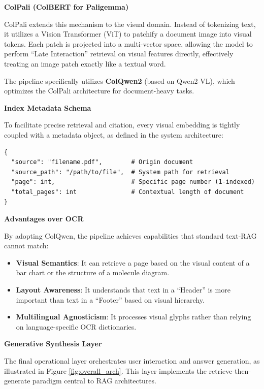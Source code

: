 \textbf{ColPali (ColBERT for Paligemma)}

ColPali extends this mechanism to the visual domain. Instead of tokenizing text, it utilizes a Vision Transformer (ViT) to patchify a document image into visual tokens. Each patch is projected into a multi-vector space, allowing the model to perform ``Late Interaction'' retrieval on visual features directly, effectively treating an image patch exactly like a textual word.

The pipeline specifically utilizes \textbf{ColQwen2} (based on Qwen2-VL), which optimizes the ColPali architecture for document-heavy tasks.

\textbf{Index Metadata Schema}

To facilitate precise retrieval and citation, every visual embedding is tightly coupled with a metadata object, as defined in the system architecture:
\begin{verbatim}
{
  "source": "filename.pdf",        # Origin document
  "source_path": "/path/to/file",  # System path for retrieval
  "page": int,                     # Specific page number (1-indexed)
  "total_pages": int               # Contextual length of document
}
\end{verbatim}

\textbf{Advantages over OCR}

By adopting ColQwen, the pipeline achieves capabilities that standard text-RAG cannot match:
\begin{itemize}
    \item \textbf{Visual Semantics}: It can retrieve a page based on the visual content of a bar chart or the structure of a molecule diagram.
    \item \textbf{Layout Awareness}: It understands that text in a ``Header'' is more important than text in a ``Footer'' based on visual hierarchy.
    \item \textbf{Multilingual Agnosticism}: It processes visual glyphs rather than relying on language-specific OCR dictionaries.
\end{itemize}

\newpage

\textbf{Generative Synthesis Layer}

The final operational layer orchestrates user interaction and answer generation, as illustrated in Figure \ref{fig:overall_arch}. This layer implements the retrieve-then-generate paradigm central to RAG architectures.

